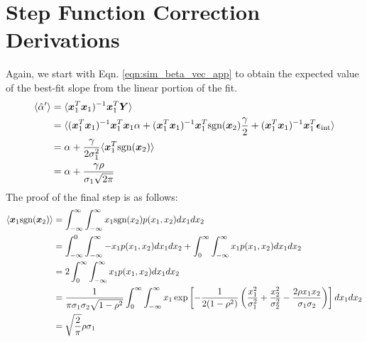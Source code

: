 \section{Step Function Correction Derivations}
\label{app:step_func}
Again, we start with Eqn. \ref{eqn:sim_beta_vec_app} to obtain the expected value of the best-fit slope from the linear portion of the fit.
\begin{align*}
    \langle\hat{\alpha}^\prime\rangle &= \langle \bm{x}_1^T\bm{x}_1)^{-1}\bm{x}_1^T\bm{Y}\rangle \\
    &= \langle(\bm{x}_1^T\bm{x}_1)^{-1}\bm{x}_1^T\bm{x}_1\alpha + (\bm{x}_1^T\bm{x}_1)^{-1}\bm{x}_1^T\text{sgn}(\bm{x}_2)\frac{\gamma}{2}+(\bm{x}_1^T\bm{x}_1)^{-1}\bm{x}_1^T\bm{\epsilon}_\text{int}\rangle\\
    &= \alpha + \frac{\gamma}{2\sigma_1^2}\langle\bm{x}_1^T\text{sgn}(\bm{x}_2)\rangle \\
    &= \alpha + \frac{\gamma\rho}{\sigma_1\sqrt{2\pi}}
\end{align*}
The proof of the final step is as follows:
\begin{align}
\label{eqn:exp_val_abs_val}
    \langle \bm{x}_1\text{sgn}(\bm{x}_2)\rangle &= \displaystyle\int_{-\infty}^\infty \displaystyle\int_{-\infty}^\infty x_1\text{sgn}(x_2)p(x_1, x_2)dx_1dx_2\nonumber\\
    &= \displaystyle\int_{-\infty}^0 \displaystyle\int_{-\infty}^\infty -x_1 p(x_1, x_2)dx_1dx_2+
    \displaystyle\int_{0}^\infty \displaystyle\int_{-\infty}^\infty x_1 p(x_1, x_2)dx_1dx_2\nonumber\\
    &= 2 \displaystyle\int_{0}^\infty \displaystyle\int_{-\infty}^\infty x_1 p(x_1, x_2)dx_1dx_2\nonumber\\
    &= \frac{1}{\pi\sigma_1\sigma_2\sqrt{1-\rho^2}}\displaystyle\int_{0}^\infty \displaystyle\int_{-\infty}^\infty x_1 \exp\left[-\frac{1}{2(1-\rho^2)}\left(\frac{x_1^2}{\sigma_1^2}+\frac{x_2^2}{\sigma_2^2}-\frac{2\rho x_1 x_2}{\sigma_1\sigma_2}\right)\right]dx_1dx_2\nonumber\\
    &= \sqrt\frac{2}{\pi}\rho\sigma_1
\end{align}

